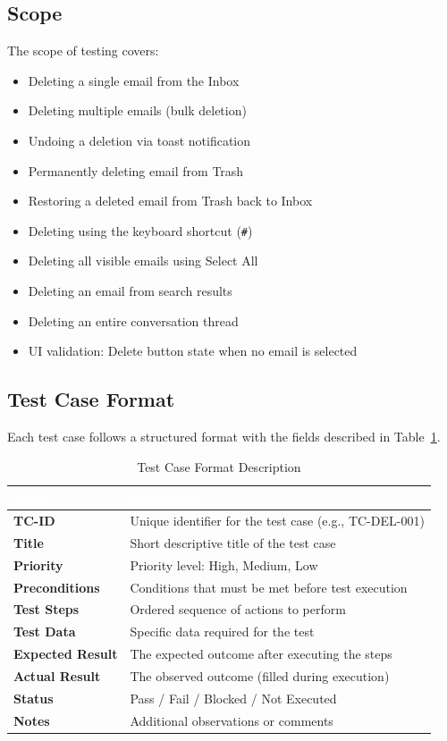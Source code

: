 \documentclass[12pt,a4paper]{article}
\begin{document}
\subsection{Scope}
The scope of testing covers:
\begin{itemize}[noitemsep]
    \item Deleting a single email from the Inbox
    \item Deleting multiple emails (bulk deletion)
    \item Undoing a deletion via toast notification
    \item Permanently deleting email from Trash
    \item Restoring a deleted email from Trash back to Inbox
    \item Deleting using the keyboard shortcut (\texttt{\#})
    \item Deleting all visible emails using Select All
    \item Deleting an email from search results
    \item Deleting an entire conversation thread
    \item UI validation: Delete button state when no email is selected
\end{itemize}

\subsection{Test Case Format}
Each test case follows a structured format with the fields described in Table~\ref{tab:format}.

\begin{table}[h!]
\centering
\caption{Test Case Format Description}
\label{tab:format}
\begin{tabularx}{\textwidth}{|l|X|}
\hline
\rowcolor{headerblue}\textcolor{white}{\textbf{Field}} & \textcolor{white}{\textbf{Description}} \\
\hline
\textbf{TC-ID}            & Unique identifier for the test case (e.g., TC-DEL-001) \\
\hline
\textbf{Title}            & Short descriptive title of the test case \\
\hline
\textbf{Priority}         & Priority level: High, Medium, Low \\
\hline
\textbf{Preconditions}    & Conditions that must be met before test execution \\
\hline
\textbf{Test Steps}       & Ordered sequence of actions to perform \\
\hline
\textbf{Test Data}        & Specific data required for the test \\
\hline
\textbf{Expected Result}  & The expected outcome after executing the steps \\
\hline
\textbf{Actual Result}    & The observed outcome (filled during execution) \\
\hline
\textbf{Status}           & Pass / Fail / Blocked / Not Executed \\
\hline
\textbf{Notes}            & Additional observations or comments \\
\hline
\end{tabularx}
\end{table}
\end{document}
